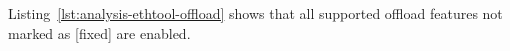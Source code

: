 Listing~\ref{lst:analysis-ethtool-offload} shows that all supported offload features not marked as [fixed] are enabled.








